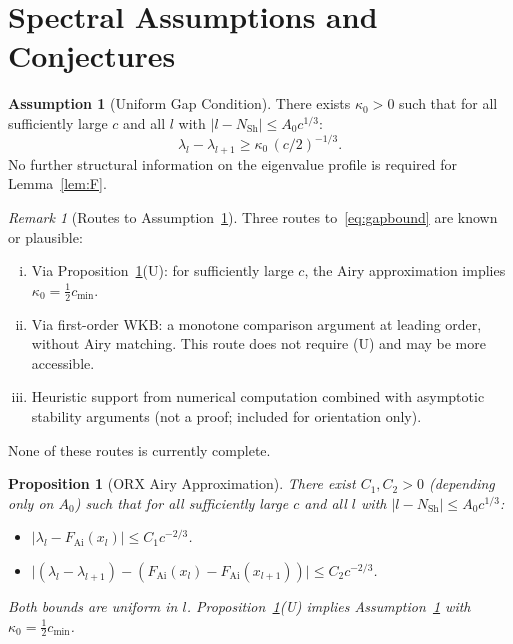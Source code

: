 \documentclass[12pt]{amsart}
\newtheorem{proposition}[theorem]{Proposition}
\theoremstyle{definition}
\newtheorem{assumption}[theorem]{Assumption}
\theoremstyle{remark}
\newtheorem{remark}[theorem]{Remark}
\newcommand{\abs}[1]{\lvert#1\rvert}
\newcommand{\FAi}{F_{\mathrm{Ai}}}
\newcommand{\NSh}{N_{\mathrm{Sh}}}
\begin{document}
\section{Spectral Assumptions and Conjectures}
\label{sec:structure}

\begin{assumption}[Uniform Gap Condition]
\label{ass:gap}
There exists $\kappa_0 > 0$ such that for all
sufficiently large $c$ and all $l$ with
$|l - \NSh| \le A_0 c^{1/3}$:
\begin{equation}\label{eq:gapbound}
  \lambda_l - \lambda_{l+1} \ge \kappa_0\,(c/2)^{-1/3}.
\end{equation}
No further structural information on the eigenvalue
profile is required for Lemma~\ref{lem:F}.
\end{assumption}

\begin{remark}[Routes to Assumption~\ref{ass:gap}]
\label{rem:gap_route}
Three routes to~\eqref{eq:gapbound} are known or plausible:
\begin{enumerate}[(i)]
\item Via Proposition~\ref{prop:U}(U): for sufficiently
  large $c$, the Airy approximation implies
  $\kappa_0 = \tfrac{1}{2}c_{\min}$.
\item Via first-order WKB: a monotone comparison
  argument at leading order, without Airy matching.
  This route does not require (U) and may be more
  accessible.
\item Heuristic support from numerical computation
  combined with asymptotic stability arguments
  (not a proof; included for orientation only).
\end{enumerate}
None of these routes is currently complete.
\end{remark}

\begin{proposition}[ORX Airy Approximation]
\label{prop:U}
There exist $C_1, C_2 > 0$ (depending only on $A_0$)
such that for all sufficiently large $c$ and all $l$
with $|l-\NSh| \le A_0 c^{1/3}$:
\begin{itemize}
\item[\textup{(U)}] $\abs{\lambda_l - \FAi(x_l)}
  \le C_1 c^{-2/3}$.
\item[\textup{(U')}] $\abs{(\lambda_l-\lambda_{l+1})
  -(\FAi(x_l)-\FAi(x_{l+1}))}
  \le C_2 c^{-2/3}$.
\end{itemize}
Both bounds are uniform in $l$.
Proposition~\ref{prop:U}\textup{(U)} implies
Assumption~\ref{ass:gap} with
$\kappa_0 = \tfrac{1}{2}c_{\min}$.
\end{proposition}
\end{document}
